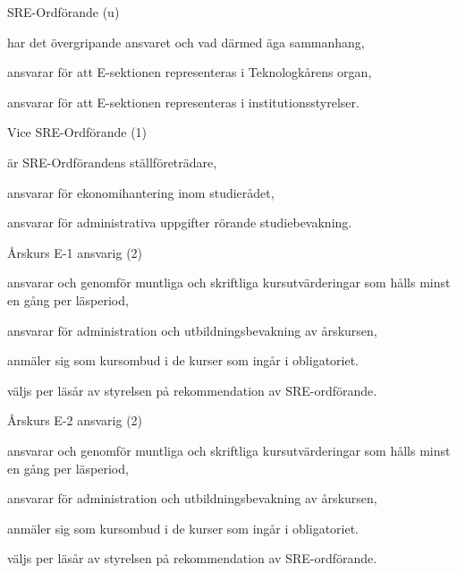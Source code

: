 \documentclass[10pt]{article}
\begin{document}
\begin{emptylist}
    \item SRE-Ordförande (u)
        \begin{dashlist}
            \item har det övergripande ansvaret och vad därmed äga
                sammanhang,
            \item ansvarar för att E-sektionen representeras i
                Teknologkårens organ,
            \item ansvarar för att E-sektionen representeras i
                institutionsstyrelser.
        \end{dashlist}
    \item Vice SRE-Ordförande (1)
        \begin{dashlist}
            \item är SRE-Ordförandens ställföreträdare,
            \item ansvarar för ekonomihantering inom studierådet,
            \item ansvarar för administrativa uppgifter rörande
                studiebevakning.
        \end{dashlist}
    \item Årskurs E-1 ansvarig (2)
        \begin{dashlist}
            \item ansvarar och genomför muntliga och skriftliga
                kursutvärderingar som hålls minst en gång per läsperiod,
            \item ansvarar för administration och utbildningsbevakning av
                årskursen,
            \item anmäler sig som kursombud i de kurser som ingår i
                obligatoriet.
            \item väljs per läsår av styrelsen på rekommendation av SRE-ordförande.
        \end{dashlist}
    \item Årskurs E-2 ansvarig (2)
        \begin{dashlist}
            \item ansvarar och genomför muntliga och skriftliga
                kursutvärderingar som hålls minst en gång per läsperiod,
            \item ansvarar för administration och utbildningsbevakning av
                årskursen,
            \item anmäler sig som kursombud i de kurser som ingår i
                obligatoriet.
              \item väljs per läsår av styrelsen på rekommendation av SRE-ordförande.

\end{dashlist}
\end{emptylist}
\end{document}
